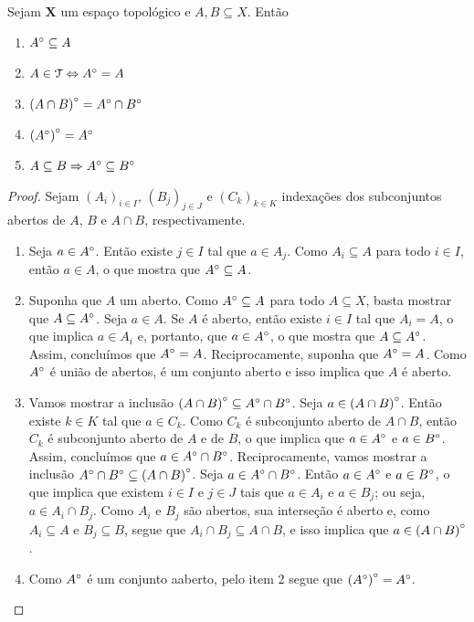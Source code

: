 \begin{prop}
	Sejam $\bm X$ um espaço topológico e $A,B \subseteq X$. Então
	\begin{enumerate}
	\item ${A}^\circ \subseteq A$
	\item $A \in \mathcal T \Leftrightarrow {A}^\circ=A$
	\item ${(A \cap B)}^\circ = {A}^\circ \cap {B}^\circ$
	\item ${({A}^\circ)}^\circ = {A}^\circ$
	\item $A \subseteq B \Rightarrow {A}^\circ \subseteq {B}^\circ$
	\end{enumerate}
\end{prop}
\begin{proof} Sejam $(A_i)_{i \in I}$, $(B_j)_{j \in J}$ e $(C_k)_{k \in K}$ indexações dos subconjuntos abertos de $A$, $B$ e $A \cap B$, respectivamente.
	\begin{enumerate}
	\item Seja $a \in {A}^\circ$. Então existe $j \in I$ tal que $a \in A_j$. Como $A_i \subseteq A$ para todo $i \in I$, então $a \in A$, o que mostra que ${A}^\circ \subseteq A$.
	
	\item Suponha que $A$ um aberto. Como ${A}^\circ \subseteq A$ para todo $A \subseteq X$, basta mostrar que $A \subseteq {A}^\circ$. Seja $a \in A$.	Se $A$ é aberto, então existe $i \in I$ tal que $A_i = A$, o que implica $a \in A_i$ e, portanto, que $a \in {A}^\circ$, o que mostra que $A \subseteq {A}^\circ$. Assim, concluímos que ${A}^\circ=A$. Reciprocamente, suponha que ${A}^\circ=A$. Como ${A}^\circ$ é união de abertos, é um conjunto aberto e isso implica que $A$ é aberto.
	
	\item Vamos mostrar a inclusão ${(A \cap B)}^\circ \subseteq {A}^\circ \cap {B}^\circ$. Seja $a \in {(A \cap B)}^\circ$. Então existe $k \in K$ tal que $a \in C_k$. Como $C_k$ é subconjunto aberto de $A \cap B$, então $C_k$ é subconjunto aberto de $A$ e de $B$, o que implica que $a \in {A}^\circ$ e $a \in {B}^\circ$. Assim, concluímos que $a \in {A}^\circ \cap {B}^\circ$. Reciprocamente, vamos mostrar a inclusão ${A}^\circ \cap {B}^\circ \subseteq {(A \cap B)}^\circ$. Seja $a \in {A}^\circ \cap {B}^\circ$. Então $a \in {A}^\circ$ e $a \in {B}^\circ$, o que implica que existem $i \in I$ e $j \in J$ tais que $a \in A_i$ e $a \in B_j$; ou seja, $a \in A_i \cap B_j$. Como $A_i$ e $B_j$ são abertos, sua interseção é aberto e, como $A_i \subseteq A$ e $B_j \subseteq B$, segue que $A_i \cap B_j \subseteq A \cap B$, e isso implica que $a \in {(A \cap B)}^\circ$.
	
	\item Como ${A}^\circ$ é um conjunto aaberto, pelo item 2 segue que ${({A}^\circ)}^\circ = {A}^\circ$.
\qedhere	
	\end{enumerate}
\end{proof}

